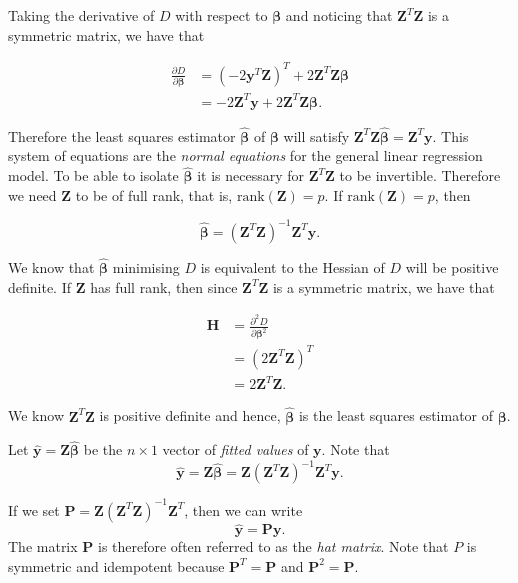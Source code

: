 \documentclass[
]{book}
\begin{document}
Taking the derivative of \(D\) with respect to \(\mathbf{\beta}\) and noticing that \(\mathbf{Z}^T\mathbf{Z}\) is a symmetric matrix, we have that

\begin{align*}
\frac{\partial D}{\partial \mathbf{\beta}} &= (-2\mathbf{y}^T\mathbf{Z})^T + 2\mathbf{Z}^T\mathbf{Z}\mathbf{\beta} \\
&= -2\mathbf{Z}^T\mathbf{y} + 2\mathbf{Z}^T\mathbf{Z}\mathbf{\beta}.
\end{align*}

Therefore the least squares estimator \(\mathbf{\hat{\beta}}\) of \(\mathbf{\beta}\) will satisfy \(\mathbf{Z}^T\mathbf{Z}\mathbf{\hat{\beta}} =\mathbf{Z}^T\mathbf{y}\). This system of equations are the \emph{normal equations} for the general linear regression model. To be able to isolate \(\mathbf{\hat{\beta}}\) it is necessary for \(\mathbf{Z}^T\mathbf{Z}\) to be invertible. Therefore we need \(\mathbf{Z}\) to be of full rank, that is, \(\text{rank}(\mathbf{Z})=p\). If \(\text{rank}(\mathbf{Z})=p\), then

\[ \mathbf{\hat{\beta}} = (\mathbf{Z}^T\mathbf{Z})^{-1} \mathbf{Z}^T\mathbf{y}.\]

We know that \(\mathbf{\hat{\beta}}\) minimising \(D\) is equivalent to the Hessian of \(D\) will be positive definite. If \(\mathbf{Z}\) has full rank, then since \(\mathbf{Z}^T\mathbf{Z}\) is a symmetric matrix, we have that

\begin{align*} 
\mathbf{H} &= \frac{\partial^2 D}{\partial \mathbf{\beta}^2} \\[3pt] 
&= (2\mathbf{Z}^T\mathbf{Z})^T \\[3pt]
&= 2\mathbf{Z}^T\mathbf{Z}.
\end{align*}

We know \(\mathbf{Z}^T\mathbf{Z}\) is positive definite and hence, \(\mathbf{\hat{\beta}}\) is the least squares estimator of \(\mathbf{\beta}\).

\hfill\break
Let \(\mathbf{\hat{y}} = \mathbf{Z}\mathbf{\hat{\beta}}\) be the \(n \times 1\) vector of \emph{fitted values} of \(\mathbf{y}\). Note that\\

\[\mathbf{\hat{y}} = \mathbf{Z} \mathbf{\hat{\beta}} = \mathbf{Z} (\mathbf{Z}^T\mathbf{Z})^{-1} \mathbf{Z}^T \mathbf{y}.\]

If we set \(\mathbf{P}=\mathbf{Z}(\mathbf{Z}^T\mathbf{Z})^{-1}\mathbf{Z}^T\), then we can write \[\mathbf{\hat{y}} = \mathbf{P} \mathbf{y}.\] The matrix \(\mathbf{P}\) is therefore often referred to as the \emph{hat matrix}. Note that \(P\) is symmetric and idempotent because \(\mathbf{P}^T=\mathbf{P}\) and \(\mathbf{P}^2=\mathbf{P}\).
\end{document}

